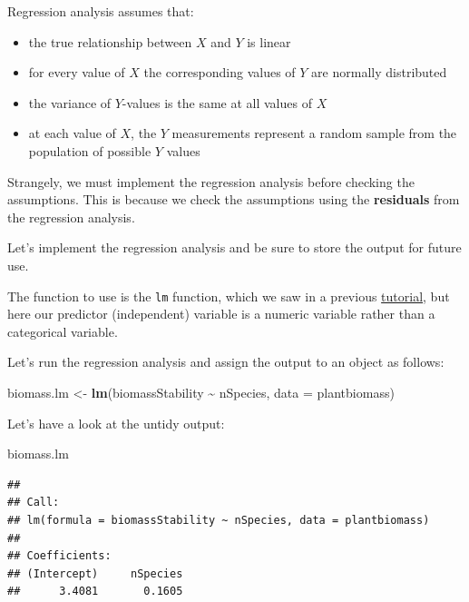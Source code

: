 \documentclass[
]{book}
\newenvironment{Shaded}{\begin{snugshade}}{\end{snugshade}}
\newcommand{\AttributeTok}[1]{\textcolor[rgb]{0.13,0.29,0.53}{#1}}
\newcommand{\FunctionTok}[1]{\textcolor[rgb]{0.13,0.29,0.53}{\textbf{#1}}}
\newcommand{\NormalTok}[1]{#1}
\newcommand{\OtherTok}[1]{\textcolor[rgb]{0.56,0.35,0.01}{#1}}
\newcommand{\SpecialCharTok}[1]{\textcolor[rgb]{0.81,0.36,0.00}{\textbf{#1}}}
\providecommand{\tightlist}{%
  \setlength{\itemsep}{0pt}\setlength{\parskip}{0pt}}
\begin{document}
Regression analysis assumes that:

\begin{itemize}
\tightlist
\item
  the true relationship between \(X\) and \(Y\) is linear\\
\item
  for every value of \(X\) the corresponding values of \(Y\) are normally distributed\\
\item
  the variance of \(Y\)-values is the same at all values of \(X\)
\item
  at each value of \(X\), the \(Y\) measurements represent a random sample from the population of possible \(Y\) values
\end{itemize}

Strangely, we must implement the regression analysis before checking the assumptions. This is because we check the assumptions using the \textbf{residuals} from the regression analysis.

Let's implement the regression analysis and be sure to store the output for future use.

The function to use is the \texttt{lm} function, which we saw in a previous \hyperref[do_anova1]{tutorial}, but here our predictor (independent) variable is a numeric variable rather than a categorical variable.

Let's run the regression analysis and assign the output to an object as follows:

\begin{Shaded}
\begin{Highlighting}[]
\NormalTok{biomass.lm }\OtherTok{\textless{}{-}} \FunctionTok{lm}\NormalTok{(biomassStability }\SpecialCharTok{\textasciitilde{}}\NormalTok{ nSpecies, }\AttributeTok{data =}\NormalTok{ plantbiomass)}
\end{Highlighting}
\end{Shaded}

Let's have a look at the untidy output:

\begin{Shaded}
\begin{Highlighting}[]
\NormalTok{biomass.lm}
\end{Highlighting}
\end{Shaded}

\begin{verbatim}
## 
## Call:
## lm(formula = biomassStability ~ nSpecies, data = plantbiomass)
## 
## Coefficients:
## (Intercept)     nSpecies  
##      3.4081       0.1605
\end{verbatim}
\end{document}
